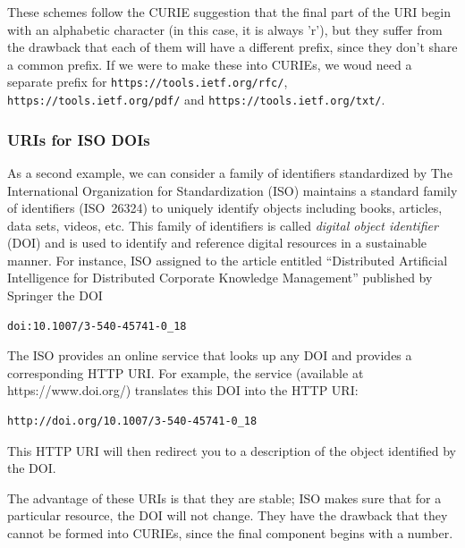 These schemes follow the CURIE suggestion that the final part of the URI begin with an alphabetic character (in this case, it is always 'r'), but they suffer from the drawback that each of them will have a different prefix, since they don't share a common prefix.  If we were to make these into CURIEs, we woud need a separate prefix for \texttt{https://tools.ietf.org/rfc/}, \texttt{https://tools.ietf.org/pdf/} and  \texttt{https://tools.ietf.org/txt/}. 

\subsubsection{URIs for ISO DOIs}


As a second example, we can consider a family of identifiers
standardized by 
The International Organization for Standardization (ISO) maintains a standard family 
of identifiers (ISO~26324) to uniquely identify objects including books, articles, data sets,
videos, etc. This family of identifiers is called \emph{digital object
identifier} (DOI) and is used to identify and reference digital
resources in a sustainable manner. For instance, ISO assigned to the article entitled
``Distributed Artificial Intelligence for Distributed Corporate
Knowledge Management'' published by Springer the DOI

\begin{lstlisting}
doi:10.1007/3-540-45741-0_18
\end{lstlisting}


The ISO  provides an online service that looks up any DOI and provides a corresponding HTTP
URI.   For example, the service (available at https://www.doi.org/) translates this DOI into the HTTP URI:


\begin{lstlisting}
http://doi.org/10.1007/3-540-45741-0_18
\end{lstlisting}


This HTTP URI will then redirect you to a description of the object
identified by the DOI.  

The advantage of these URIs is that they are stable; ISO makes sure that for a particular 
resource, the DOI will not change.  They have the drawback that they cannot be formed into 
CURIEs, since the final component begins with a number. 






